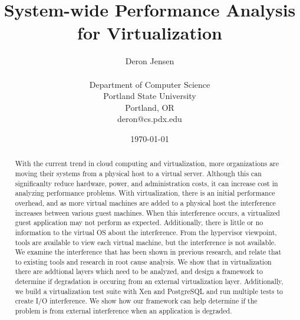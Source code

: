 \documentclass[12pt,onecolumn,oneside]{article}
\begin{document}
\title{System-wide Performance Analysis for Virtualization}
\author{Deron Jensen\\
\\
Department of Computer Science\\
Portland State University\\
Portland, OR \\
deron@cs.pdx.edu \\
}
\date{\today}
  \maketitle
\newpage

\begin{abstract}
With the current trend in cloud computing and virtualization, more organizations are moving their systems from a physical host to a virtual server.  Although this can significanlty reduce hardware, power, and administration costs, it can increase cost in analyzing performance problems.  With virtualization, there is an initial performance overhead, and as more virtual machines are added to a physical host the interference increases between various guest machines.  When this interference occurs, a virtualized guest application may not perform as expected.  Additionally, there is little or no information to the virtual OS about the interference.  From the hypervisor viewpoint, tools are available to view each virtual machine, but the interference is not available. \newline
\indent  We examine the interference that has been shown in previous research, and relate that to existing tools and research in root cause analysis.  We show that in virtualization there are addtional layers which need to be analyzed, and design a framework to determine if degradation is occuring from an external virtualization layer.  Additionally, we build a virtualization test suite with Xen and PostgreSQL and run multiple tests to create I/O interference.  We show how our framework can help determine if the problem is from external interference when an application is degraded.   
  \end{abstract}
\newpage

\setcounter{page}{1}

\tableofcontents    %
\newpage
\listoftables
\newpage
\listoffigures 
\newpage
\end{document}
